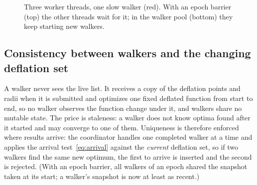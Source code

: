 \documentclass[11pt]{article}
\begin{document}
\begin{figure}[t]
\centering
{}
\caption{Three worker threads, one slow walker (red). With an epoch barrier (top) the other
threads wait for it; in the walker pool (bottom) they keep starting new walkers.}
\label{fig:timeline}
\end{figure}

\subsection{Consistency between walkers and the changing deflation set}

A walker never sees the live list. It receives a copy of the deflation points and radii when it
is submitted and optimizes one fixed deflated function from start to end, so no walker observes
the function change under it, and walkers share no mutable state. The price is staleness: a
walker does not know optima found after it started and may converge to one of them. Uniqueness
is therefore enforced where results arrive: the coordinator handles one completed walker at a
time and applies the arrival test~\eqref{eq:arrival} against the \emph{current} deflation set,
so if two walkers find the same new optimum, the first to arrive is inserted and the second is
rejected. (With an epoch barrier, all walkers of an epoch shared the snapshot taken at its
start; a walker's snapshot is now at least as recent.)
\end{document}

